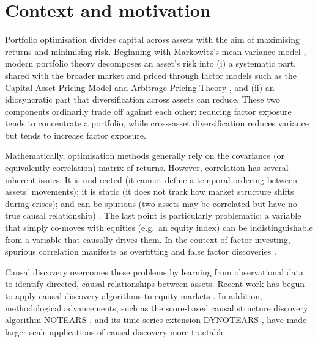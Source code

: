\documentclass[12pt, a4paper]{report}
\begin{document}
\section{Context and motivation}

Portfolio optimisation divides capital across assets with the aim of maximising returns and minimising risk. Beginning with Markowitz's mean-variance model \cite{markowitz1952portfolio},
modern portfolio theory decomposes an asset's risk into (i) a systematic part, shared with the
broader market and priced through factor models such as the Capital Asset Pricing Model
\cite{sharpe1964capm} and Arbitrage Pricing Theory \cite{ross1976apt}, and (ii) an
idiosyncratic part that diversification across assets can reduce. These two components ordinarily trade off against each other: 
reducing factor exposure tends to concentrate a portfolio, 
while cross-asset diversification reduces variance but tends to
increase factor exposure.

Mathematically, optimisation methods generally rely on the covariance (or equivalently correlation) matrix of returns. 
However, correlation has several inherent issues.
It is undirected (it cannot define a temporal ordering between assets' movements); it is static (it does not track how market structure shifts during crises); and can be spurious (two assets may be correlated but have no true causal relationship) \cite{simon1954spurious}. 
The last point is particularly problematic:
a variable that simply co-moves with equities (e.g.~an equity index) can be
indistinguishable from a variable that causally drives them. 
In the context of factor investing, spurious correlation manifests as
overfitting and false factor discoveries \cite{lopezdeprado2023causal}.

Causal discovery overcomes these problems by learning from observational data to identify directed, causal relationships between assets.
Recent work has begun to apply causal-discovery algorithms to equity
markets \cite{howard2025causal,tang2024trading}. In addition, methodological advancements, such as the score-based causal structure discovery algorithm NOTEARS \cite{zheng2018notears}, and its time-series extension DYNOTEARS
\cite{pamfil2020dynotears}, have made larger-scale applications of causal discovery more tractable.
\end{document}
